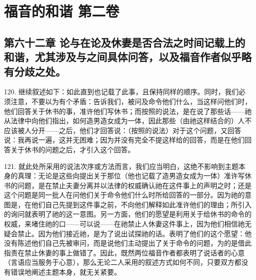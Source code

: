 

\section{福音的和谐 第二卷}


\subsection{第六十二章 论与在论及休妻是否合法之时间记载上的和谐，尤其涉及与之间具体问答，以及福音作者似乎略有分歧之处。}

120. 继续叙述如下：如此直到也记载了此事，且保持同样的顺序。同时，我们必须注意，不要以为有个矛盾：告诉我们，被问及命令他们什么，当这样问他们时，他们回答关于休书的事，准许他们写休书；而按照的说法，是在说了那些话——祂从法律中向他们指出，如何造男造女成为一体，因此那些（由祂这样结合的）人不应该被人分开——之后，他们才回答说：（按照的说法）对于这个问题，又回答说：我再说一遍，这并无困难；因为并没有完全不提这样给的回答，而是在他们回答关于休书的问题之后，才引入这个回答。\par

121. 就此处所采用的说法次序或方法而言，我们应当明白，这绝不影响到主题本身的真理：无论是这些向提出关于那位（他也记载了造男造女成为一体）准许写休书的问题，是在禁止夫妻分离并以法律的权威确认祂在这件事上的声明之时；还是这个问题是同一批人在问他们关于命令他们什么时所给回答的一部分。因为祂的意图是，在他们自己先提到这件事之前，不向他们解释如此准许他们的理由；所引入的询问就表明了祂的这一意图。另一方面，他们的愿望是利用关于给休书的命令的权威，来堵住祂的口——可以说——在祂禁止人休妻这件事上，因为他们相信祂无疑会禁止。因为他们接近祂，是为了说出试探祂的话。表明了他们的这个愿望：他没有陈述他们自己先被审问，而是说他们主动提出了关于命令的问题，为的是借此指责在禁止休妻的事上做错了。因此，既然两位福音作者都表明了说话者的心意（言语应当服务于心意），那么无论二人采用的叙述方式如何不同，只要双方都没有错误地阐述主题本身，就无关紧要。\par


